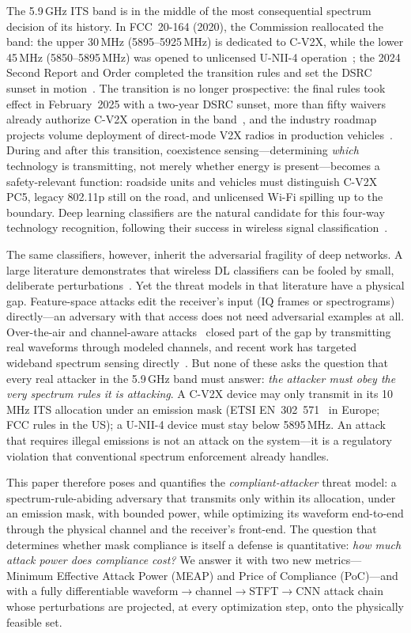 \documentclass[review]{elsarticle}
\begin{document}
The 5.9\,GHz ITS band is in the middle of the most consequential spectrum
decision of its history. In FCC~20-164 (2020), the Commission reallocated the
band: the upper 30\,MHz (5895--5925\,MHz) is dedicated to C-V2X, while the
lower 45\,MHz (5850--5895\,MHz) was opened to unlicensed U-NII-4
operation~\cite{fcc2020}; the 2024 Second Report and Order completed the
transition rules and set the DSRC sunset in motion~\cite{fcc2024}. The
transition is no longer prospective: the final rules took effect in
February~2025 with a two-year DSRC sunset, more than fifty waivers already
authorize C-V2X operation in the band~\cite{itsa2024}, and the industry
roadmap projects volume deployment of direct-mode V2X radios in production
vehicles~\cite{5gaa2024}. During and
after this transition, coexistence sensing---determining \emph{which}
technology is transmitting, not merely whether energy is present---becomes a
safety-relevant function: roadside units and vehicles must distinguish C-V2X
PC5, legacy 802.11p still on the road, and unlicensed Wi-Fi spilling up to the
boundary. Deep learning classifiers are the natural candidate for this
four-way technology recognition, following their success in wireless signal
classification~\cite{o2018,girmay2023}.

The same classifiers, however, inherit the adversarial fragility of deep
networks. A large literature demonstrates that wireless DL classifiers can be
fooled by small, deliberate perturbations~\cite{sadeghi2019,liu2022}. Yet the
threat models in that literature have a physical gap. Feature-space attacks
edit the receiver's input (IQ frames or spectrograms) directly---an adversary
with that access does not need adversarial examples at all. Over-the-air and
channel-aware attacks~\cite{kim2020,sagduyu2021,radioshock2026} closed part of
the gap by transmitting real waveforms through modeled channels, and recent
work has targeted wideband spectrum sensing directly~\cite{zheng2026}. But
none of these asks the question that every real attacker in the 5.9\,GHz band
must answer: \emph{the attacker must obey the very spectrum rules it is
attacking}. A C-V2X device may only transmit in its 10\,MHz ITS allocation
under an emission mask (ETSI EN~302~571~\cite{etsi302571} in Europe; FCC rules
in the US); a U-NII-4 device must stay below 5895\,MHz. An attack that
requires illegal emissions is not an attack on the system---it is a
regulatory violation that conventional spectrum enforcement already handles.

This paper therefore poses and quantifies the \emph{compliant-attacker}
threat model: a spectrum-rule-abiding adversary that transmits only within its
allocation, under an emission mask, with bounded power, while optimizing its
waveform end-to-end through the physical channel and the receiver's
front-end. The question that determines whether mask compliance is itself a
defense is quantitative: \emph{how much attack power does compliance cost?}
We answer it with two new metrics---Minimum Effective Attack Power (MEAP) and
Price of Compliance (PoC)---and with a fully differentiable
waveform$\to$channel$\to$STFT$\to$CNN attack chain whose perturbations are
projected, at every optimization step, onto the physically feasible set.
\end{document}
